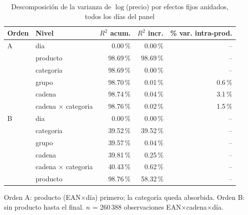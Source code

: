 \begin{table}[htbp]
\caption{Descomposici\'on de la varianza de $\log$(precio) por efectos fijos anidados, todos los d\'ias del panel}
\label{tab:varianza}
\centering\scriptsize\setlength{\tabcolsep}{3pt}
\begin{tabular}{@{}llrrr@{}}
\toprule
Orden & Nivel & $R^2$ acum. & $R^2$ incr. & \% var. intra-prod. \\
\midrule
A & dia & 0.00\,\% & 0.00\,\% & -- \\
 & producto & 98.69\,\% & 98.69\,\% & -- \\
 & categoria & 98.69\,\% & 0.00\,\% & -- \\
 & grupo & 98.70\,\% & 0.01\,\% & 0.6\,\% \\
 & cadena & 98.74\,\% & 0.04\,\% & 3.1\,\% \\
 & cadena $\times$ categoria & 98.76\,\% & 0.02\,\% & 1.5\,\% \\
\midrule
B & dia & 0.00\,\% & 0.00\,\% & -- \\
 & categoria & 39.52\,\% & 39.52\,\% & -- \\
 & grupo & 39.57\,\% & 0.04\,\% & -- \\
 & cadena & 39.81\,\% & 0.25\,\% & -- \\
 & cadena $\times$ categoria & 40.43\,\% & 0.62\,\% & -- \\
 & producto & 98.76\,\% & 58.32\,\% & -- \\
\bottomrule\end{tabular}
\par\smallskip\raggedright\scriptsize Orden A: producto (EAN$\times$d\'ia) primero; la categor\'ia queda absorbida. Orden B: sin producto hasta el final. $n$ = 260\,388 observaciones EAN$\times$cadena$\times$d\'ia.
\end{table}
